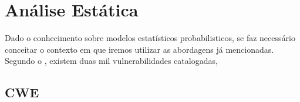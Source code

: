 

\section{Análise Estática}

Dado o conhecimento sobre modelos estatísticos probabilisticos, se faz necessário conceitar o contexto em que iremos utilizar as abordagens
já mencionadas. Segundo o \cite{mitre}, existem duas mil vulnerabilidades catalogadas, 

\subsection{CWE}
